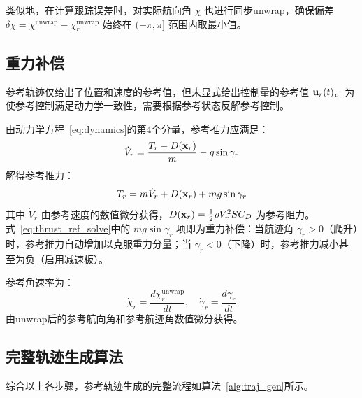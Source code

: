 类似地，在计算跟踪误差时，对实际航向角 $\chi$ 也进行同步unwrap，确保偏差 $\delta\chi = \chi^{\text{unwrap}} - \chi_r^{\text{unwrap}}$ 始终在 $(-\pi, \pi]$ 范围内取最小值。

\subsection{重力补偿}\label{sec:gravity_comp}

参考轨迹仅给出了位置和速度的参考值，但未显式给出控制量的参考值 $\mathbf{u}_r(t)$。为使参考控制满足动力学一致性，需要根据参考状态反解参考控制。

由动力学方程~\eqref{eq:dynamics}的第4个分量，参考推力应满足：
\begin{equation}\label{eq:thrust_ref}
\dot{V}_r = \frac{T_r - D(\mathbf{x}_r)}{m} - g \sin\gamma_r
\end{equation}
解得参考推力：
\begin{equation}\label{eq:thrust_ref_solve}
T_r = m\dot{V}_r + D(\mathbf{x}_r) + m g \sin\gamma_r
\end{equation}
其中 $\dot{V}_r$ 由参考速度的数值微分获得，$D(\mathbf{x}_r) = \frac{1}{2}\rho V_r^2 S C_D$ 为参考阻力。式~\eqref{eq:thrust_ref_solve}中的 $mg\sin\gamma_r$ 项即为重力补偿：当航迹角 $\gamma_r > 0$（爬升）时，参考推力自动增加以克服重力分量；当 $\gamma_r < 0$（下降）时，参考推力减小甚至为负（启用减速板）。

参考角速率为：
\begin{equation}\label{eq:rate_ref}
\dot{\chi}_r = \frac{d\chi_r^{\text{unwrap}}}{dt}, \quad \dot{\gamma}_r = \frac{d\gamma_r}{dt}
\end{equation}
由unwrap后的参考航向角和参考航迹角数值微分获得。

\subsection{完整轨迹生成算法}

综合以上各步骤，参考轨迹生成的完整流程如算法~\ref{alg:traj_gen}所示。

